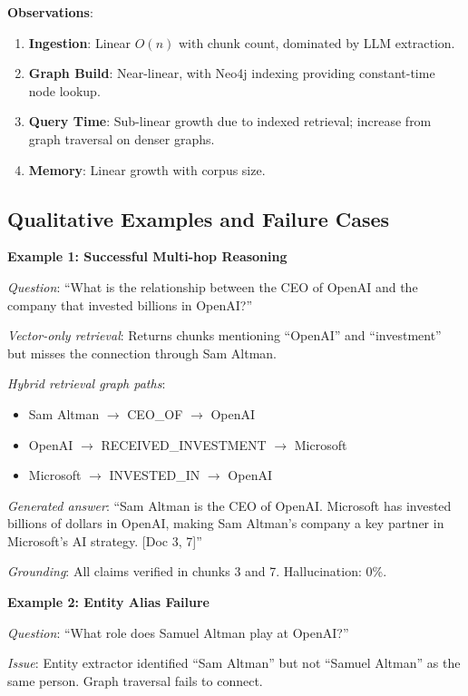 \documentclass[conference]{IEEEtran}
\begin{document}
\textbf{Observations}:

\begin{enumerate}
    \item \textbf{Ingestion}: Linear $O(n)$ with chunk count, dominated by LLM extraction.
    \item \textbf{Graph Build}: Near-linear, with Neo4j indexing providing constant-time node lookup.
    \item \textbf{Query Time}: Sub-linear growth due to indexed retrieval; increase from graph traversal on denser graphs.
    \item \textbf{Memory}: Linear growth with corpus size.
\end{enumerate}

\subsection{Qualitative Examples and Failure Cases}

\textbf{Example 1: Successful Multi-hop Reasoning}

\textit{Question}: ``What is the relationship between the CEO of OpenAI and the company that invested billions in OpenAI?''

\textit{Vector-only retrieval}: Returns chunks mentioning ``OpenAI'' and ``investment'' but misses the connection through Sam Altman.

\textit{Hybrid retrieval graph paths}:
\begin{itemize}
    \item Sam Altman $\rightarrow$ CEO\_OF $\rightarrow$ OpenAI
    \item OpenAI $\rightarrow$ RECEIVED\_INVESTMENT $\rightarrow$ Microsoft
    \item Microsoft $\rightarrow$ INVESTED\_IN $\rightarrow$ OpenAI
\end{itemize}

\textit{Generated answer}: ``Sam Altman is the CEO of OpenAI. Microsoft has invested billions of dollars in OpenAI, making Sam Altman's company a key partner in Microsoft's AI strategy. [Doc 3, 7]''

\textit{Grounding}: All claims verified in chunks 3 and 7. Hallucination: 0\%.

\textbf{Example 2: Entity Alias Failure}

\textit{Question}: ``What role does Samuel Altman play at OpenAI?''

\textit{Issue}: Entity extractor identified ``Sam Altman'' but not ``Samuel Altman'' as the same person. Graph traversal fails to connect.
\end{document}
